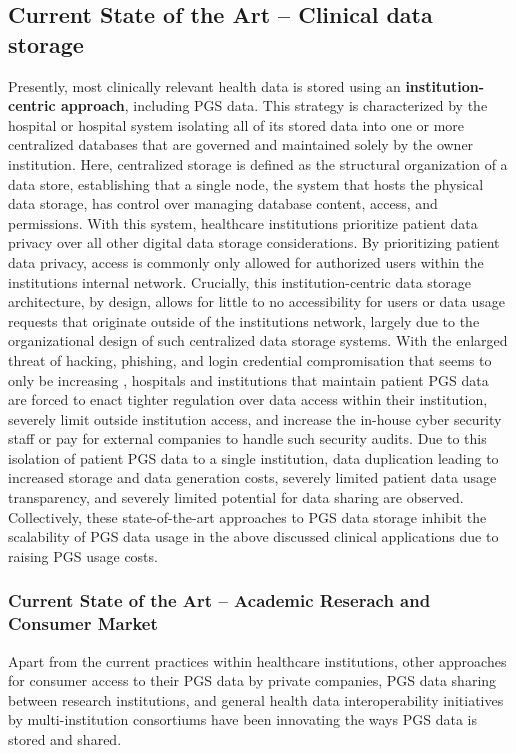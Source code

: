 \documentclass[runningheads]{llncs}
\begin{document}
\subsection{Current State of the Art -- Clinical data storage}
Presently, most clinically relevant health data is stored using an \textbf{institution-centric approach}, including PGS data. 
This strategy is characterized by the hospital or hospital system isolating all of its stored data into one or more centralized databases that are governed and maintained solely by the owner institution. 
Here, centralized storage is defined as the structural organization of a data store, establishing that a single node, the system that hosts the physical data storage, has control over managing database content, access, and permissions. 
With this system, healthcare institutions prioritize patient data privacy over all other digital data storage considerations. 
By prioritizing patient data privacy, access is commonly only allowed for authorized users within the institution\textquotesingle s internal network. 
Crucially, this institution-centric data storage architecture, by design, allows for little to no accessibility for users or data usage requests that originate outside of the institution\textquotesingle s network, largely due to the organizational design of such centralized data storage systems. 
With the enlarged threat of hacking, phishing, and login credential compromisation that seems to only be increasing \cite{noauthor_ransomware_nodate}, hospitals and institutions that maintain patient PGS data are forced to enact tighter regulation over data access within their institution, severely limit outside institution access, and increase the in-house cyber security staff or pay for external companies to handle such security audits.  
Due to this isolation of patient PGS data to a single institution, data duplication leading to increased storage and data generation costs, severely limited patient data usage transparency, and severely limited potential for data sharing are observed. 
Collectively, these state-of-the-art approaches to PGS data storage inhibit the scalability of PGS data usage in the above discussed clinical applications due to raising PGS usage costs.

\subsubsection{Current State of the Art -- Academic Reserach and Consumer Market}
Apart from the current practices within healthcare institutions, other approaches for consumer access to their PGS data by private companies, PGS data sharing between research institutions, and general health data interoperability initiatives by multi-institution consortiums have been innovating the ways PGS data is stored and shared. 
\end{document}
